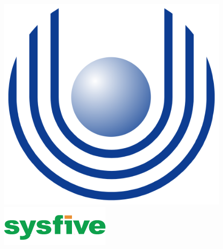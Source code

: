 \title{\titel}
\author{\autor}

\setcounter{secnumdepth}{3}
\setcounter{tocdepth}{3}

\if@twoside
  \fancyfoot[OR]{}
  \fancyfoot[EL]{}
  \fancyfoot[OL]{}
  \fancyfoot[ER]{}

\else
  \fancyfoot[R]{}
  \fancyfoot[L]{}
\fi

\begin{titlepage}
\begin{figure}
    \begin{minipage}{0.2\textwidth}
        \begin{flushleft}
            \includegraphics[scale=0.20]{images/logo_left.png}
        \end{flushleft}
    \end{minipage}
    \begin{minipage}{0.55\textwidth}
        \centering
        \hspace{0.25cm}
    \end{minipage}
    \begin{minipage}{0.2\textwidth}
        \begin{flushleft}
            \includegraphics[scale=0.5]{images/logo_right.png}

\end{flushleft}
\end{minipage}
\end{figure}
\end{titlepage}
